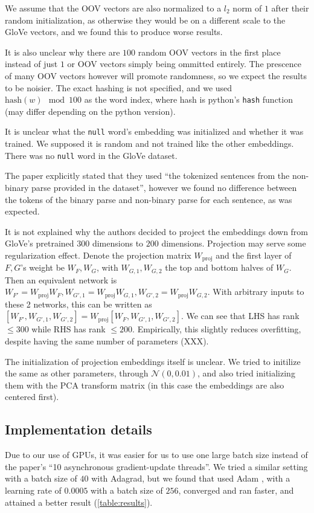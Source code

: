 \documentclass{article}
\begin{document}
We assume that the OOV vectors are also normalized to a $l_2$ norm of $1$ after their random initialization, as otherwise they would be on a different scale to the GloVe vectors, and we found this to produce worse results.

It is also unclear why there are $100$ random OOV vectors in the first place instead of just $1$ or OOV vectors simply being ommitted entirely. The prescence of many OOV vectors however will promote randomness, so we expect the results to be noisier. The exact hashing is not specified, and we used $\text{hash}(w) \mod 100$ as the word index, where hash is python's \texttt{hash} function (may differ depending on the python version).

It is unclear what the \texttt{null} word's embedding was initialized and whether it was trained. We supposed it is random and not trained like the other embeddings. There was no \texttt{null} word in the GloVe dataset.

The paper explicitly stated that they used ``the tokenized sentences from the non-binary parse provided in the dataset'', however we found no difference between the tokens of the binary parse and non-binary parse for each sentence, as was expected.

It is not explained why the authors decided to project the embeddings down from GloVe's pretrained $300$ dimensions to $200$ dimensions. Projection may serve some regularization effect. Denote the projection matrix $W_\text{proj}$ and the first layer of $F, G$'s weight be $W_F, W_G$, with $W_{G,1}, W_{G,2}$ the top and bottom halves of $W_G$. Then an equivalent network is $W_{F'} = W_\text{proj} W_F, W_{G',1} = W_\text{proj} W_{G,1}, W_{G',2} = W_\text{proj} W_{G,2}$. With arbitrary inputs to these 2 networks, this can be written as $[W_{F'}, W_{G',1}, W_{G',2}] = W_\text{proj} [W_F, W_{G',1}, W_{G',2}]$. We can see that LHS has rank $\le 300$ while RHS has rank $\le 200$. Empirically, this slightly reduces overfitting, despite having the same number of parameters (XXX).

The initialization of projection embeddings itself is unclear. We tried to initilize the same as other parameters, through $\mathcal{N}(0, 0.01)$, and also tried initializing them with the PCA transform matrix (in this case the embeddings are also centered first).

\subsection{Implementation details}
Due to our use of GPUs, it was easier for us to use one large batch size instead of the paper's ``10 asynchronous gradient-update threads''. We tried a similar setting with a batch size of $40$ with Adagrad, but we found that used Adam \citep{kingma_adam:_2014}, with a learning rate of $0.0005$ with a batch size of $256$, converged and ran faster, and attained a better result (\autoref{table:results}).
\end{document}
